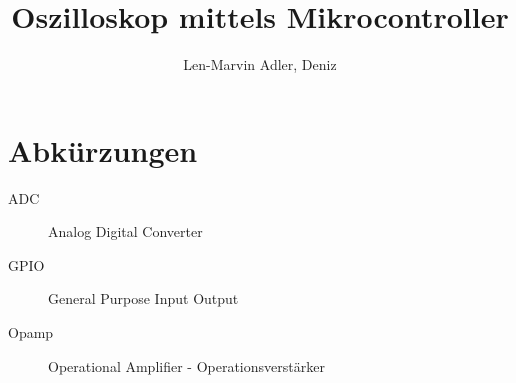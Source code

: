 \documentclass[]{article}
\title{Oszilloskop mittels Mikrocontroller}
\author{Len-Marvin Adler, Deniz}
\begin{document}
\maketitle
\thispagestyle{empty}
\clearpage
\tableofcontents
\thispagestyle{empty}
\clearpage

\setcounter{page}{3}
\section*{Abkürzungen}
\begin{description}
	\item[ADC]
	Analog Digital Converter
	
	\item[GPIO]
	General Purpose Input Output
	
	\item[Opamp]
	Operational Amplifier - Operationsverstärker
\end{description}
\clearpage

\setcounter{page}{1}



















\end{document}

